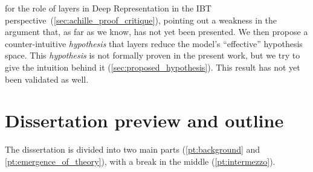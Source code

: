 \documentclass[
  letterpaper,
  a4paper,
  12pt,
  twoside,
  brazil,
  british,
  open=right]{scrbook}
\begin{document}
\begin{enumerate}
  for the role of layers in Deep Representation in the {IBT}
  perspective~(\protect\hyperlink{sec:achille_proof_critique}{{[}sec:achille\_proof\_critique{]}}),
  pointing out a weakness in the argument that, as far as we know, has
  not yet been presented. We then propose a counter-intuitive
  \emph{hypothesis} that layers reduce the model's ``effective''
  hypothesis space. This \emph{hypothesis} is not formally proven in the
  present work, but we try to give the intuition behind it
  (\protect\hyperlink{sec:proposed_hypothesis}{{[}sec:proposed\_hypothesis{]}}).
  This result has not yet been validated as well.
\end{enumerate}

\hypertarget{dissertation-preview-and-outline}{%
\section{Dissertation preview and
outline}\label{dissertation-preview-and-outline}}

The dissertation is divided into two main parts
(\protect\hyperlink{pt:background}{{[}pt:background{]}} and
\protect\hyperlink{pt:emergence_of_theory}{{[}pt:emergence\_of\_theory{]}}),
with a break in the middle
(\protect\hyperlink{pt:intermezzo}{{[}pt:intermezzo{]}}).
\end{document}
